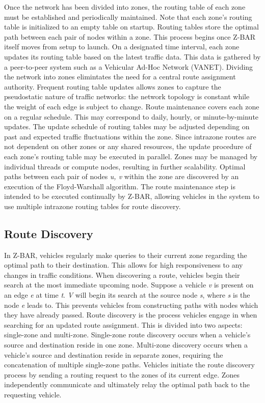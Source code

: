 \documentclass[conference]{IEEEtran}
\begin{document}
Once the network has been divided into zones, the routing table of each zone must be established and periodically maintained. Note that each zone's routing table is initialized to an empty table on startup. Routing tables store the optimal path between each pair of nodes within a zone. This process begins once Z-BAR itself moves from setup to launch. On a designated time interval, each zone updates its routing table based on the latest traffic data. This data is gathered by a peer-to-peer system such as a Vehicular Ad-Hoc Network (VANET). Dividing the network into zones elimintates the need for a central route assignment authority. Frequent routing table updates allows zones to capture the pseudostatic nature of traffic networks: the network topology is constant while the weight of each edge is subject to change.
Route maintenance covers each zone on a regular schedule. This may correspond to daily, hourly, or minute-by-minute updates. The update schedule of routing tables may be adjusted depending on past and expected traffic fluctuations within the zone. Since intrazone routes are not dependent on other zones or any shared resources, the update procedure of each zone's routing table may be executed in parallel. Zones may be managed by individual threads or compute nodes, resulting in further scalability. Optimal paths between each pair of nodes \textit{u, v} within the zone are discovered by an execution of the Floyd-Warshall algorithm. The route maintenance step is intended to be executed continually by Z-BAR, allowing vehicles in the system to use multiple intrazone routing tables for route discovery.

\subsection{Route Discovery}

In Z-BAR, vehicles regularly make queries to their current zone regarding the optimal path to their destination. This allows for high responsiveness to any changes in traffic conditions. When discovering a route, vehicles begin their search at the most immediate upcoming node. Suppose a vehicle \textit{v} is present on an edge \textit{e} at time \textit{t}. \textit{V} will begin its search at the source node \textit{s}, where \textit{s} is the node \textit{e} leads to. This prevents vehicles from constructing paths with nodes which they have already passed. Route discovery is the process vehicles engage in when searching for an updated route assignment. This is divided into two aspects: single-zone and multi-zone. Single-zone route discovery occurs when a vehicle's source and destination reside in one zone. Multi-zone discovery occurs when a vehicle's source and destination reside in separate zones, requiring the concatenation of multiple single-zone paths. Vehicles initiate the route discovery process by sending a routing request to the zones of its current edge. Zones independently communicate and ultimately relay the optimal path back to the requesting vehicle.
\end{document}
